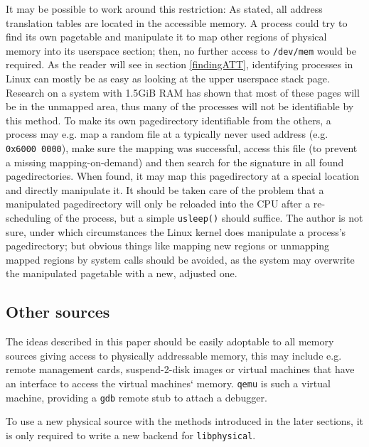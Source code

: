It may be possible to work around this restriction: As stated, all address
translation tables are located in the accessible memory. A process could try to
find its own pagetable and manipulate it to map other regions of physical memory
into its userspace section; then, no further access to \texttt{/dev/mem} would
be required. As the reader will see in section \ref{findingATT}, identifying
processes in Linux can mostly be as easy as looking at the upper userspace stack
page. Research on a system with 1.5GiB RAM has shown that most of these pages
will be in the unmapped area, thus many of the processes will not be
identifiable by this method. To make its own pagedirectory identifiable from the
others, a process may e.g\@. map a random file at a typically never used address
(e.g\@. \texttt{0x6000~0000}), make sure the mapping was successful, access this
file (to prevent a missing mapping-on-demand) and then search for the signature
in all found pagedirectories. When found, it may map this pagedirectory at a
special location and directly manipulate it. It should be taken care of the
problem that a manipulated pagedirectory will only be reloaded into the CPU
after a re-scheduling of the process, but a simple \texttt{usleep()} should
suffice. The author is not sure, under which circumstances the Linux kernel does
manipulate a process's pagedirectory; but obvious things like mapping new
regions or unmapping mapped regions by system calls should be avoided, as the
system may overwrite the manipulated pagetable with a new, adjusted one.



\subsection{Other sources}

The ideas described in this paper should be easily adoptable to all memory
sources giving access to physically addressable memory, this may include e.g\@.
remote management cards, suspend-2-disk images or virtual machines that have an
interface to access the virtual machines` memory. \texttt{qemu} is such a
virtual machine, providing a \texttt{gdb} remote stub to attach a debugger.

To use a new physical source with the methods introduced in the later sections,
it is only required to write a new backend for \texttt{libphysical}.

